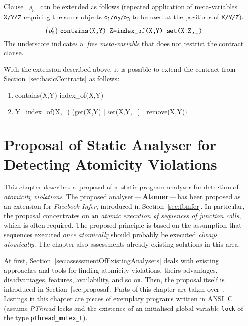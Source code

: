 Clause~$ \varrho_5 $~can be extended as follows (repeated application of
meta-variables \texttt{X/Y/Z} requiring the same objects
\texttt{o\textsubscript{1}/o\textsubscript{2}/o\textsubscript{3}} to be used
at the positions of \texttt{X/Y/Z}):
$$
    (\varrho^\prime_5)\ \text{\texttt{%
        contains(X,Y) Z=index\_of(X,Y) set(X,Z,\_)
    }}
$$
The underscore indicates a~\emph{free meta-variable} that does not restrict
the contract clause.

With the extension described above, it is possible to extend the contract
from Section~\ref{sec:basicContracts} as follows:
\begin{enumerate}[label={$ (\varrho^\prime_{\arabic*}) $}]
    \tt

    \item contains(X,Y) index\_of(X,Y)
    \item Y=index\_of(X,\_) (get(X,Y) | set(X,Y,\_) | remove(X,Y))
\end{enumerate}



\chapter{Proposal of Static Analyser for Detecting Atomicity Violations}
\label{chap:proposal}

This chapter describes a~proposal of a~static program analyser for
detection of \emph{atomicity violations}. The proposed
analyser\,---\,\textbf{Atomer}\,---\,has been proposed as an extension
for \emph{Facebook Infer}, introduced in Section~\ref{sec:fbinfer}. In
particular, the proposal concentrates on an \emph{atomic execution of
sequences of function calls}, which is often required. The
proposed principle is based on the assumption that sequences executed
\emph{once atomically} should probably be executed \emph{always atomically}.
The chapter also assessments already existing solutions in this area.

At first, Section~\ref{sec:assessmentOfExistingAnalysers} deals with
existing approaches and tools for finding atomicity violations, theirs
advantages, disadvantages, features, availability, and so on. Then,
the proposal itself is introduced in Section~\ref{sec:proposal}. Parts of
this chapter are taken over~\cite{excel2019FBInfer}. Listings in this
chapter are pieces of exemplary programs written in ANSI~C (assume
\emph{PThread} locks and the existence of an initialised global variable
\texttt{lock} of the type \texttt{pthread\_mutex\_t}).



